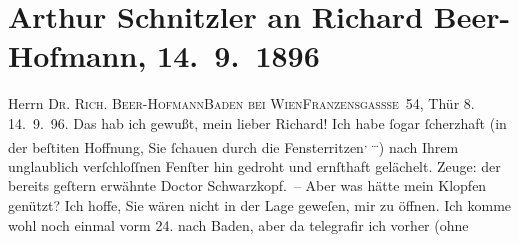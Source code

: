 

         
         \renewcommand{\erwaehntePersonen}{Personen:  ?? [Dienstbote], Richard Beer-Hofmann, Gustav Schwarzkopf}
         \renewcommand{\erwaehnteOrte}{Orte: Baden bei Wien, I., Innere Stadt, Kaiser-Franz-Ring, Wien}
         \renewcommand{\erwaehnteWerke}{}
               \section[Arthur Schnitzler an Richard Beer-Hofmann, 14. 9. 1896]{ Arthur Schnitzler an Richard Beer-Hofmann, 14. 9. 1896}\nopagebreak{}\rehead{ }\begin{ledgroupsized}[t]{13cm}\normalsize\beginnumbering \toendnotes[C]{\smallbreak\pagebreak[2]} 
\toendnotes[C]{\smallbreak}\pstart{}{\pb}Herrn \textsc{Dr. Rich.
                     Beer-Hofmann}\pend{}\pstart{}\textsc{Baden bei Wien}\pend{}\pstart{}\textsc{Franzensgassse 54}, Thür 8.\pend{}{\bigskip}\pstart
           \raggedleft{}{\pb}14. 9. 96.\pend
           \pstart
           Das hab ich gewußt, mein lieber Richard! Ich habe ſogar ſcherzhaft
                  \introOben{}(\introOben{}in der beſti{\geminationm}ten Hoffnung,
               Sie ſchauen durch die Fensterritzen\substVorne{}\textsuperscript{, {\dots}}\substDazwischen{})\substHinten{} nach Ihrem unglaublich verſchloſſnen Fenſter hin gedroht und ernſthaft
               gelächelt. Zeuge: {\pb}der bereits geſtern erwähnte Doctor
                  Schwarzkopf. – Aber was hätte mein Klopfen
               genützt? Ich hoffe, Sie wären nicht in der Lage geweſen, mir zu öffnen.\pend
           \pstart
           Ich komme wohl noch einmal vorm 24. nach Baden, {\pb}aber da telegrafir ich vorher (ohne

\end{ledgroupsized}

